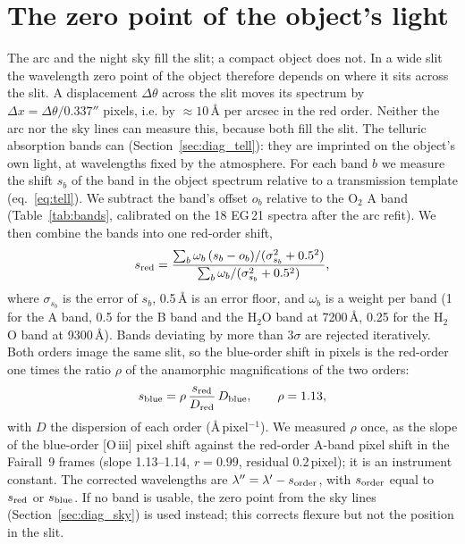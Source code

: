 \section{The zero point of the object's light}
\label{sec:wl_zp}
The arc and the night sky fill the slit; a compact object does not. In a wide slit the wavelength zero point of the
object therefore depends on where it sits across the slit. A displacement $\Delta\theta$ across the slit moves its
spectrum by $\Delta x=\Delta\theta/0.337''$ pixels, i.e. by $\approx10$\,\AA{} per arcsec in the red order. Neither
the arc nor the sky lines can measure this, because both fill the slit. The telluric absorption bands can
(Section~\ref{sec:diag_tell}): they are imprinted on the object's own light, at wavelengths fixed by the atmosphere.
For each band $b$ we measure the shift $s_b$ of the band in the object spectrum relative to a transmission template
(eq.~\ref{eq:tell}). We subtract the band's offset $o_b$ relative to the O$_2$ A band (Table~\ref{tab:bands},
calibrated on the 18 EG\,21 spectra after the arc refit). We then combine the bands into one red-order shift,
\begin{equation}
s_{\rm red}=\frac{\sum_b \omega_b\,(s_b-o_b)/(\sigma_{s_b}^2+0.5^2)}{\sum_b \omega_b/(\sigma_{s_b}^2+0.5^2)},
\label{eq:tellcomb}
\end{equation}
where $\sigma_{s_b}$ is the error of $s_b$, 0.5\,\AA{} is an error floor, and $\omega_b$ is a weight per band (1 for
the A band, 0.5 for the B band and the H$_2$O band at 7200\,\AA, 0.25 for the H$_2$O band at 9300\,\AA). Bands
deviating by more than $3\sigma$ are rejected iteratively. Both orders image the same slit, so the blue-order shift in pixels is the red-order one times the ratio $\rho$ of
the anamorphic magnifications of the two orders:
\begin{equation}
s_{\rm blue} = \rho\,\frac{s_{\rm red}}{D_{\rm red}}\,D_{\rm blue},\qquad \rho=1.13,
\label{eq:transfer}
\end{equation}
with $D$ the dispersion of each order (\AA\,pixel$^{-1}$). We measured $\rho$ once, as the slope of the blue-order
[O\,{\sc iii}] pixel shift against the red-order A-band pixel shift in the Fairall~9 frames (slope 1.13--1.14,
$r=0.99$, residual 0.2\,pixel); it is an instrument constant. The corrected wavelengths are
$\lambda''=\lambda'-s_{\rm order}$, with $s_{\rm order}$ equal to $s_{\rm red}$ or $s_{\rm blue}$. If no band is usable,
the zero point from the sky lines (Section~\ref{sec:diag_sky}) is used instead; this corrects flexure but not the
position in the slit.

